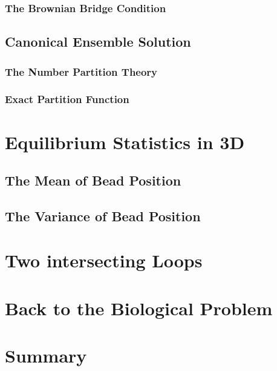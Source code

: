 \subsubsection{The Brownian Bridge Condition}
\label{ssub:The Brownian Bridge Condition}


\subsection{Canonical Ensemble Solution}
\label{sub:canonical_ensemble_solution}

\subsubsection{The Number Partition Theory}
\label{ssub:The Number Partition Theory}

\subsubsection{Exact Partition Function}
\label{ssub:Exact Partition Function}


\section{Equilibrium Statistics in 3D}
\label{sec:equilibrium_statistics_in_3d}

\subsection{The Mean of Bead Position}
\label{sub:the_mean_of_bead_position}

\subsection{The Variance of Bead Position}
\label{sub:the_variance_of_bead_position}





\section{Two intersecting Loops}
\label{sec:two_intersecting_loops}


\section{Back to the Biological Problem}
\label{sec:back_to_the_biological_problem}



\section{Summary}
\label{sec:summary}
